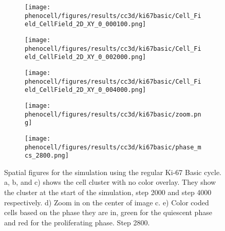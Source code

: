 \begin{figure}[!htbp]
    \centering
    \begin{subfigure}{.32\textwidth}
        \texttt{[image: phenocell/figures/results/cc3d/ki67basic/Cell\_Field\_CellField\_2D\_XY\_0\_000100.png]}
        \caption{}\label{fig:res:cc3d:ki67basic:space:0}
    \end{subfigure}
    \begin{subfigure}{.32\textwidth}
        \texttt{[image: phenocell/figures/results/cc3d/ki67basic/Cell\_Field\_CellField\_2D\_XY\_0\_002000.png]}
        \caption{}\label{fig:res:cc3d:ki67basic:space:2000}
    \end{subfigure}
    \begin{subfigure}{.32\textwidth}
        \texttt{[image: phenocell/figures/results/cc3d/ki67basic/Cell\_Field\_CellField\_2D\_XY\_0\_004000.png]}
        \caption{}\label{fig:res:cc3d:ki67basic:space:4000}
    \end{subfigure}
    \begin{subfigure}{.32\textwidth}
        \texttt{[image: phenocell/figures/results/cc3d/ki67basic/zoom.png]}
        \caption{}\label{fig:res:cc3d:ki67basic:space:4000:zoom}
    \end{subfigure}
    \begin{subfigure}{.32\textwidth}
        \texttt{[image: phenocell/figures/results/cc3d/ki67basic/phase\_mcs\_2800.png]}
        \caption{}\label{fig:res:cc3d:ki67basic:space:phase}
    \end{subfigure}
    \caption{Spatial figures for the \ccds simulation using the regular Ki-67 Basic cycle. a, b, and c) shows the cell cluster with no color overlay. They show the cluster at the start of the simulation, step 2000 and step 4000 respectively. d) Zoom in on the center of image c. e) Color coded cells based on the phase they are in, green for the quiescent phase and red for the proliferating phase. Step 2800.}
    \label{fig:res:cc3d:ki67basic:space}
\end{figure}


